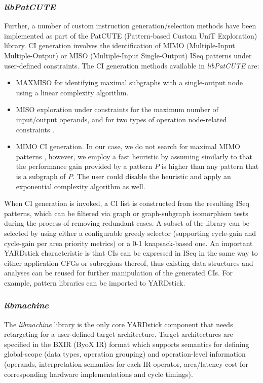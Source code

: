 \documentclass{comjnl}
\begin{document}
\subsubsection{{\it libPatCUTE}}
\label{Sec:libpatcute}
Further, a number of custom instruction generation/selection methods have been implemented as part of the PatCUTE (Pattern-based Custom UniT Exploration) library. CI generation involves the identification of MIMO (Multiple-Input Multiple-Output) or MISO (Multiple-Input Single-Output) ISeq patterns under user-defined constraints. The CI generation methods available in {\it libPatCUTE} are:
\begin{itemize}
\item {MAXMISO \cite{Alippi99} for identifying maximal subgraphs with a single-output node using a linear complexity algorithm.}
\item {MISO exploration under constraints for the maximum number of input/output operands, and for two types of operation node-related constraints \cite{Kavvadias05}.} 
\item {MIMO CI generation. In our case, we do not search for maximal MIMO patterns \cite{Pothineni07}, however, we employ a fast heuristic by assuming similarly to \cite{Pothineni07} that the performance gain provided by a pattern $P$ is higher than any pattern that is a subgraph of $P$. The user could disable the heuristic and apply an exponential complexity algorithm as well.}
\end{itemize}

When CI generation is invoked, a CI list is constructed from the resulting ISeq patterns, which can be filtered via graph or graph-subgraph isomorphism tests \cite{VFLib2} during the process of removing redundant cases. A subset of the library can be selected by using either a configurable greedy selector (supporting cycle-gain and cycle-gain per area priority metrics) or a 0-1 knapsack-based one. An important YARDstick characteristic is that CIs can be expressed in ISeq in the same way to either application CFGs or subregions thereof, thus existing data structures and analyses can be reused for further manipulation of the generated CIs. For example, pattern libraries can be imported to YARDstick.

\subsubsection{{\it libmachine}}
\label{Sec:libmachine}
The {\it libmachine} library is the only core YARDstick component that needs retargeting for a user-defined target architecture. Target architectures are specified in the BXIR (ByoX IR) 
format which supports semantics for defining global-scope (data types, operation grouping) and operation-level information (operands, interpretation semantics for each IR operator, area/latency cost for corresponding hardware implementations and cycle timings). 
\end{document}
